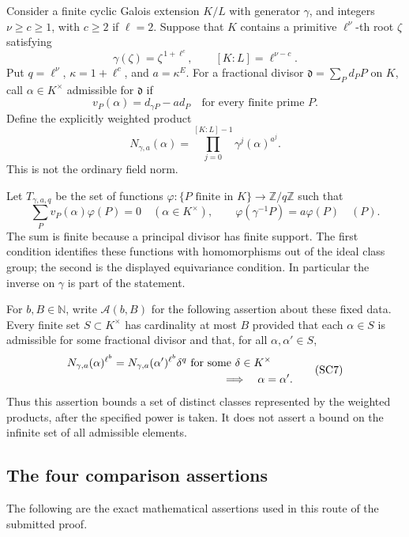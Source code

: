 Consider a finite cyclic Galois extension $K/L$ with generator
$\gamma$, and integers $\nu\ge c\ge1$, with $c\ge2$ if $\ell=2$.
Suppose that $K$ contains a primitive $\ell^\nu$-th root
$\zeta$ satisfying
\[
          \gamma(\zeta)=\zeta^{\,1+\ell^c},
          \qquad [K:L]=\ell^{\nu-c}.
          \tag{SC3}
\]
Put $q=\ell^\nu$, $\kappa=1+\ell^c$, and $a=\kappa^E$.
For a fractional divisor $\mathfrak d=\sum_P d_P P$
on $K$, call $\alpha\in K^\times$ admissible for
$\mathfrak d$ if
\[
                v_P(\alpha)=d_{\gamma P}-a d_P
                       \quad\text{for every finite prime }P.
                \tag{SC4}
\]
Define the explicitly weighted product
\[
       N_{\gamma,a}(\alpha)
          =\prod_{j=0}^{[K:L]-1}\gamma^j(\alpha)^{a^j}.
          \tag{SC5}
\]
This is not the ordinary field norm.

Let $T_{\gamma,a,q}$ be the set of functions
$\varphi:\{P\text{ finite in }K\}\to\mathbb Z/q\mathbb Z$
such that
\[
 \sum_P v_P(\alpha)\varphi(P)=0\quad(\alpha\in K^\times),
 \qquad
 \varphi(\gamma^{-1}P)=a\varphi(P)\quad(P).
 \tag{SC6}
\]
The sum is finite because a principal divisor has finite
support.  The first condition identifies these functions
with homomorphisms out of the ideal class group; the second
is the displayed equivariance condition.  In particular
the inverse on $\gamma$ is part of the statement.

For $b,B\in\mathbb N$, write $\mathcal A(b,B)$ for the
following assertion about these fixed data.  Every finite
set $S\subset K^\times$ has cardinality at most $B$
provided that each $\alpha\in S$ is admissible for some
fractional divisor and that, for all $\alpha,\alpha'\in S$,
\[
 \begin{split}
 N_{\gamma,a}(\alpha)^{\ell^b}
     &=N_{\gamma,a}(\alpha')^{\ell^b}\delta^q
       \text{ for some }\delta\in K^\times\\
 &\hspace{35mm}\Longrightarrow\quad\alpha=\alpha'.
 \end{split}
 \tag{SC7}
\]
Thus this assertion bounds a set of distinct classes
represented by the weighted products, after the specified
power is taken.  It does not assert a bound on the infinite
set of all admissible elements.

\subsection{The four comparison assertions}

The following are the exact mathematical assertions used in this
route of the submitted proof\cite{alpo-uniform-source}.

